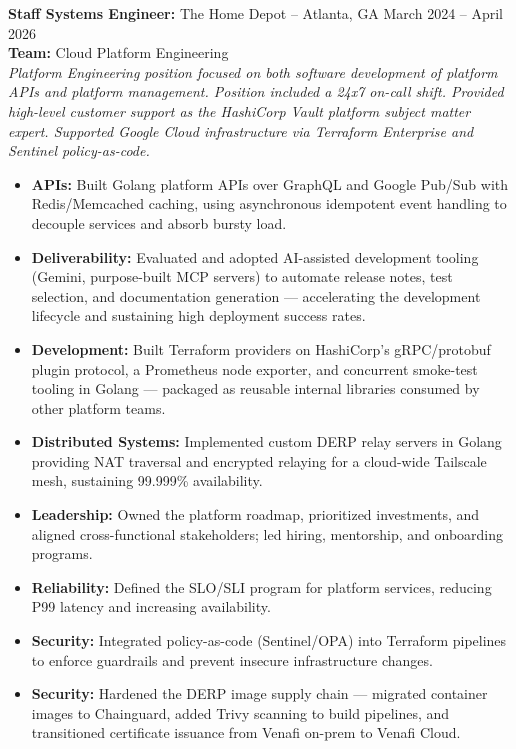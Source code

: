 \documentclass[11pt]{article}       %
\begin{document}
\begin{description}
\item\textbf{Staff Systems Engineer:} {The Home Depot} -- Atlanta, GA \hfill March 2024 -- April 2026 \\
\textbf{Team:} Cloud Platform Engineering \\
\textit{Platform Engineering position focused on both software development of platform APIs and platform management. Position included a 24x7 on-call shift. Provided high-level customer support as the HashiCorp Vault platform subject matter expert. Supported Google Cloud infrastructure via Terraform Enterprise and Sentinel policy-as-code.} \\
\vspace{-6.5pt}
\begin{itemize}
  \item \textbf{APIs:} Built Golang platform APIs over GraphQL and Google Pub/Sub with Redis/Memcached caching, using asynchronous idempotent event handling to decouple services and absorb bursty load.
  \item \textbf{Deliverability:} Evaluated and adopted AI-assisted development tooling (Gemini, purpose-built MCP servers) to automate release notes, test selection, and documentation generation — accelerating the development lifecycle and sustaining high deployment success rates.
  \item \textbf{Development:} Built Terraform providers on HashiCorp's gRPC/protobuf plugin protocol, a Prometheus node exporter, and concurrent smoke-test tooling in Golang — packaged as reusable internal libraries consumed by other platform teams.
  \item \textbf{Distributed Systems:} Implemented custom DERP relay servers in Golang providing NAT traversal and encrypted relaying for a cloud-wide Tailscale mesh, sustaining 99.999\% availability.
  \item \textbf{Leadership:} Owned the platform roadmap, prioritized investments, and aligned cross-functional stakeholders; led hiring, mentorship, and onboarding programs.
  \item \textbf{Reliability:} Defined the SLO/SLI program for platform services, reducing P99 latency and increasing availability.
  \item \textbf{Security:} Integrated policy-as-code (Sentinel/OPA) into Terraform pipelines to enforce guardrails and prevent insecure infrastructure changes.
  \item \textbf{Security:} Hardened the DERP image supply chain — migrated container images to Chainguard, added Trivy scanning to build pipelines, and transitioned certificate issuance from Venafi on-prem to Venafi Cloud.
\end{itemize}
\end{description}
\end{document}
